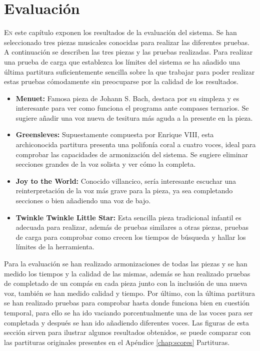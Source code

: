 \chapter{Evaluación}
\label{chap:evaluation}
\vspace{0.5cm}


 \lettrine{E}{n} este capítulo exponen los resultados de la evaluación del sistema. Se han seleccionado tres piezas musicales conocidas para realizar las diferentes pruebas. A continuación se describen las tres piezas y las pruebas realizadas. Para realizar una prueba de carga que establezca los límites del sistema se ha añadido una última partitura suficientemente sencilla sobre la que trabajar para poder realizar estas pruebas cómodamente sin preocuparse por la calidad de los resultados.
 
 \begin{itemize}
 	\item \textbf{Menuet:} Famosa pieza de Johann S. Bach, destaca por su simpleza y es interesante para ver como funciona el programa ante compases ternarios. Se sugiere añadir una voz nueva de tesitura más aguda a la presente en la pieza.
 	\item \textbf{Greensleves:} Supuestamente compuesta por Enrique VIII, esta archiconocida partitura presenta una polifonía coral a cuatro voces, ideal para comprobar las capacidades de armonización del sistema. Se sugiere eliminar secciones grandes de la voz solista y ver cómo la completa.
 	\item \textbf{Joy to the World:} Conocido villancico, sería interesante escuchar una reinterpretación de la voz más grave para la pieza, ya sea completando secciones o bien añadiendo una voz de bajo.
    \item \textbf{Twinkle Twinkle Little Star:} Esta sencilla pieza tradicional infantil es adecuada para realizar, además de pruebas similares a otras piezas, pruebas de carga para comprobar como crecen los tiempos de búsqueda y hallar los límites de la herramienta.
 \end{itemize}
 
 Para la evaluación se han realizado armonizaciones de todas las piezas y se han medido los tiempos y la calidad de las mismas, además se han realizado pruebas de completado de un compás en cada pieza junto con la inclusión de una nueva voz, también se han medido calidad y tiempo. Por último, con la última partitura se han realizado pruebas para comprobar hasta donde funciona bien en cuestión temporal, para ello se ha ido vaciando porcentualmente una de las voces para ser completada y después se han ido añadiendo diferentes voces. Las figuras de esta sección sirven para ilustrar algunos resultados obtenidos, se puede comparar con las partituras originales presentes en el Apéndice \ref{chap:scores} Partituras.
 
